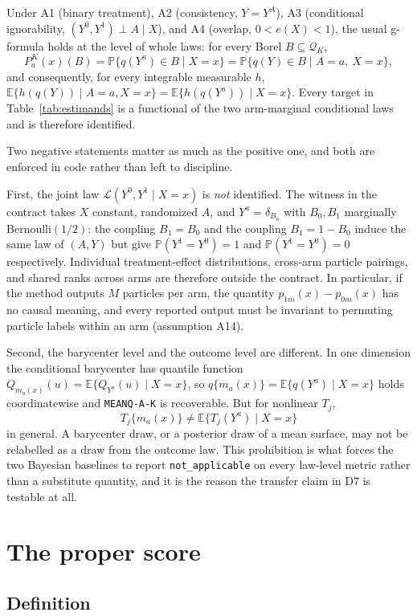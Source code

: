 \documentclass[11pt,a4paper]{article}
\theoremstyle{definition}
\theoremstyle{remark}
\newcommand{\Qcal}{\mathcal{Q}}
\newcommand{\Exp}{\mathbb{E}}
\newcommand{\Prob}{\mathbb{P}}
\begin{document}
Under A1 (binary treatment), A2 (consistency, $Y = Y^A$), A3 (conditional
ignorability, $(Y^0,Y^1) \perp A \mid X$), and A4 (overlap, $0 < e(X) < 1$), the
usual g-formula holds at the level of whole laws: for every Borel
$B \subseteq \Qcal_K$,
\[
P_a^K(x)(B) = \Prob\{q(Y^a) \in B \mid X = x\}
            = \Prob\{q(Y) \in B \mid A = a,\ X = x\},
\]
and consequently, for every integrable measurable $h$,
$\Exp\{h(q(Y))\mid A=a, X=x\} = \Exp\{h(q(Y^a))\mid X=x\}$. Every target in
Table~\ref{tab:estimands} is a functional of the two arm-marginal conditional
laws and is therefore identified.

Two negative statements matter as much as the positive one, and both are
enforced in code rather than left to discipline.

First, the joint law $\mathcal{L}(Y^0, Y^1 \mid X = x)$ is \emph{not} identified.
The witness in the contract takes $X$ constant, randomized $A$, and
$Y^a = \delta_{B_a}$ with $B_0, B_1$ marginally Bernoulli$(1/2)$: the coupling
$B_1 = B_0$ and the coupling $B_1 = 1 - B_0$ induce the same law of $(A, Y)$ but
give $\Prob(Y^1 = Y^0) = 1$ and $\Prob(Y^1 = Y^0) = 0$ respectively. Individual
treatment-effect distributions, cross-arm particle pairings, and shared ranks
across arms are therefore outside the contract. In particular, if the method
outputs $M$ particles per arm, the quantity $p_{1m}(x) - p_{0m}(x)$ has no causal
meaning, and every reported output must be invariant to permuting particle
labels within an arm (assumption A14).

Second, the barycenter level and the outcome level are different. In one
dimension the conditional barycenter has quantile function
$Q_{m_a(x)}(u) = \Exp\{Q_{Y^a}(u) \mid X = x\}$, so
$q\{m_a(x)\} = \Exp\{q(Y^a) \mid X = x\}$ holds coordinatewise and
\texttt{MEANQ-A-K} is recoverable. But for nonlinear $T_j$,
\[
T_j\{m_a(x)\} \neq \Exp\{T_j(Y^a) \mid X = x\}
\]
in general. A barycenter draw, or a posterior draw of a mean surface, may not be
relabelled as a draw from the outcome law. This prohibition is what forces the
two Bayesian baselines to report \texttt{not\_applicable} on every law-level
metric rather than a substitute quantity, and it is the reason the transfer
claim in D7 is testable at all.

\section{The proper score}

\subsection{Definition}
\end{document}
